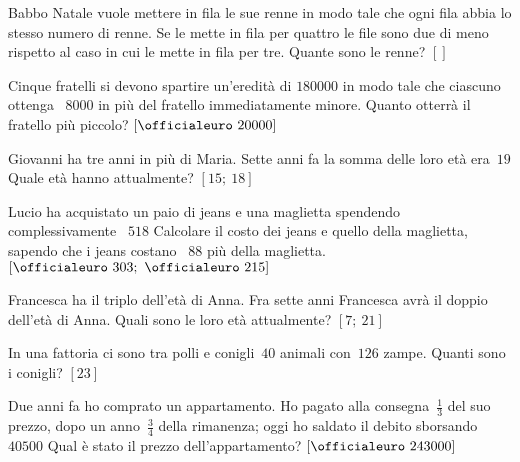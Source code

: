 \begin{multicols}{2}
\begin{esercizio}[\Ast]
\label{ese:14.57}
Babbo Natale vuole mettere in fila le sue renne in modo tale che ogni fila 
abbia 
lo stesso numero di renne. Se le mette in fila per quattro le file sono due di 
meno rispetto al caso in cui le mette in fila per tre. Quante sono le renne?
 \hfill $\left[\right]$
\end{esercizio}

\begin{esercizio}[\Ast]
\label{ese:14.58}
Cinque fratelli si devono spartire un'eredità di \officialeuro$180000$ in modo 
tale che ciascuno ottenga \officialeuro~$8000$ in più del fratello 
immediatamente minore. Quanto otterrà il fratello più piccolo?
 \hfill $\left[\officialeuro~20000\right]$
\end{esercizio}

\begin{esercizio}[\Ast]
\label{ese:14.59}
Giovanni ha tre anni in più di Maria. Sette anni fa la somma delle loro età 
era~$19$ Quale età hanno attualmente? \hfill $\left[15;~18\right]$
\end{esercizio}

\begin{esercizio}[\Ast]
\label{ese:14.60}
Lucio ha acquistato un paio di jeans e una maglietta spendendo complessivamente 
\officialeuro~$518$ Calcolare il costo dei jeans e quello della maglietta, 
sapendo che i jeans costano \officialeuro~$88$ più della maglietta.
 \hfill $\left[\officialeuro~303;~\officialeuro~215\right]$
\end{esercizio}

\begin{esercizio}[\Ast]
\label{ese:14.61}
Francesca ha il triplo dell'età di Anna. Fra sette anni Francesca avrà il 
doppio 
dell'età di Anna. Quali sono le loro età attualmente? 
\hfill $\left[7;~21\right]$
\end{esercizio}

\begin{esercizio}[\Ast]
\label{ese:14.62}
In una fattoria ci sono tra polli e conigli~$40$ animali con~$126$ zampe. 
Quanti 
sono i conigli? \hfill $\left[23\right]$
\end{esercizio}

\begin{esercizio}[\Ast]
\label{ese:14.63}
Due anni fa ho comprato un appartamento. Ho pagato alla consegna~$\frac{1}{3}$ 
del suo prezzo, dopo un anno~$\frac{3}{4}$ della rimanenza; oggi ho saldato il 
debito sborsando \officialeuro~$40500$ Qual è stato il prezzo dell'appartamento?
 \hfill $\left[\officialeuro~243000\right]$
\end{esercizio}


\end{multicols}
